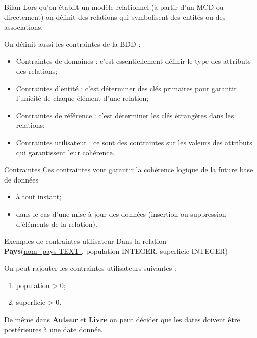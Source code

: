 \documentclass[10pt]{beamer}
\begin{document}
\begin{frame}{Bilan}
	Lors qu'on établit un modèle relationnel (à partir d'un MCD ou directement) on définit des relations qui symbolisent des entités ou des associations.

	On définit aussi les \alert{contraintes} de la BDD :
	\begin{itemize}
		\item	\alert{Contraintes de domaines} : c'est essentiellement définir le type des attributs des relations;
		\item	\alert{Contraintes d'entité} : c'est déterminer des clés primaires pour garantir l'unicité de chaque élément d'une relation;
		\item 	\alert{Contraintes de référence} : c'est déterminer les clés étrangères dans les relations;
		\item 	\alert{Contraintes utilisateur} : ce sont des contraintes sur les valeurs des attributs qui garantissent leur cohérence.
	\end{itemize}
\end{frame}
\begin{frame}{Contraintes}
	Ces contraintes vont garantir la cohérence logique de la future base de données
	\begin{itemize}
		\item	à tout instant;
		\item	dans le cas d'une mise à jour des données (insertion ou suppression d'éléments de la relation).
	\end{itemize}
\end{frame}
\begin{frame}{Exemples de contraintes utilisateur}
	Dans la relation \\

	{\footnotesize
		\textbf{Pays}(\uline{nom\_pays TEXT }, population INTEGER, superficie INTEGER)\\}

	On peut rajouter les contraintes utilisateurs suivantes :
	\begin{enumerate}[--]
		\item 	population > 0;
		\item 	superficie > 0.
	\end{enumerate}
	De même dans \textbf{Auteur} et \textbf{Livre} on peut décider que les dates doivent être postérieures à une date donnée.
\end{frame}
\end{document}
